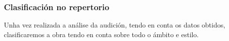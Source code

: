 \subsubsection*{Clasificación no repertorio} \label{Clasificación-dies-irae}
Unha vez realizada a análise da audición, tendo en conta os datos obtidos, clasificaremos a obra tendo en conta sobre todo o ámbito e estilo.
%
%
\vspace*{0.5cm}
\begin{ejercicio}

%

        \vspace*{2.78cm}
\end{ejercicio}

